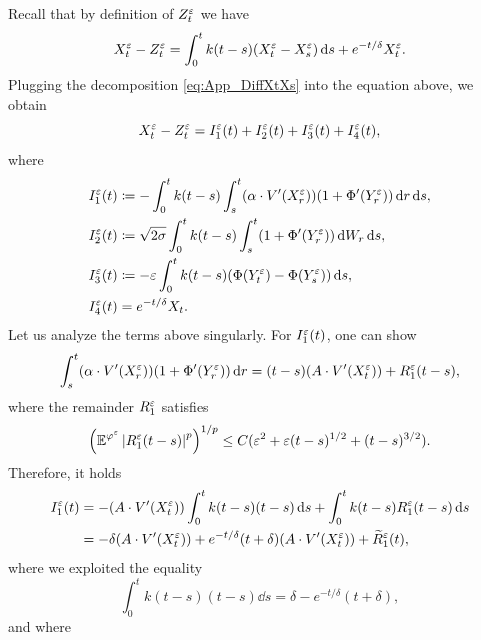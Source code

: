 \documentclass[10pt]{article}
\begin{document}
\begin{appendices}
Recall that by definition of $Z_t^\varepsilon$ we have
	\begin{equation}
	X_t^\varepsilon - Z_t^\varepsilon = \int_0^t k(t-s) (X_t^\varepsilon - X_s^\varepsilon) \,\mathrm{d} s + e^{-t/\delta}X_t^\varepsilon.
	\end{equation}
	Plugging the decomposition \eqref{eq:App_DiffXtXs} into the equation above, we obtain
	\begin{equation}
	X_t^\varepsilon - Z_t^\varepsilon = I_1^\varepsilon(t) + I_2^\varepsilon(t) + I_3^\varepsilon(t) + I_4^\varepsilon(t),
	\end{equation}
	where
	\begin{equation}
	\begin{aligned}
	I_1^\varepsilon(t) &\coloneqq -\int_0^t k(t-s)\int_s^t (\alpha \cdot V'(X_r^\varepsilon))(1 + \Phi'(Y^\varepsilon_r)) \,\mathrm{d} r \,\mathrm{d} s,\\
	I_2^\varepsilon(t) &\coloneqq \sqrt{2\sigma}\int_0^t k(t-s) \int_s^t (1 + \Phi'(Y_r^\varepsilon)) \,\mathrm{d} W_r \,\mathrm{d} s, \\
	I_3^\varepsilon(t) &\coloneqq - \varepsilon \int_0^t k(t-s)(\Phi(Y^\varepsilon_t)-\Phi(Y^\varepsilon_s)) \,\mathrm{d} s,\\
	I_4^\varepsilon(t) &= e^{-t / \delta}X_t.
	\end{aligned}
	\end{equation}
	Let us analyze the terms above singularly. For $I_1^\varepsilon(t)$, one can show \cite[Proposition 5.8]{PaS07}
	\begin{equation}
	\int_s^t (\alpha \cdot V'(X_r^\varepsilon)) (1 + \Phi'(Y^\varepsilon_r)) \,\mathrm{d} r = (t - s)(A \cdot V'(X_t^\varepsilon)) + R_1^\varepsilon(t-s),
	\end{equation}
	where the remainder $R_1^\varepsilon$ satisfies 
	\begin{equation}\label{eq:FirstTermPavStu}
	\left(\operatorname{\mathbb{E}}^{\varphi^\varepsilon}\left\lvert R_1^\varepsilon(t-s)\right\rvert^p\right)^{1/p} \leq C(\varepsilon^2 + \varepsilon(t-s)^{1/2}+(t-s)^{3/2}).
	\end{equation}
	Therefore, it holds 
	\begin{equation}\label{eq:Diff_I1}
	\begin{aligned}
	I_1^\varepsilon(t) &= -(A \cdot V'(X_t^\varepsilon)) \int_0^t k(t-s) (t-s)\,\mathrm{d} s + \int_0^t k(t-s)R_1^\varepsilon(t-s) \,\mathrm{d} s\\
	&= -\delta (A \cdot  V'(X_t^\varepsilon)) + e^{-t/\delta}(t + \delta)(A \cdot V'(X_t^\varepsilon)) + \widetilde R_1^\varepsilon(t),
	\end{aligned}
	\end{equation}
	where we exploited the equality
	\begin{equation}
	\int_0^t k(t-s) (t-s) \dd s = \delta - e^{-t/\delta}(t + \delta),
	\end{equation}
	and where
	\begin{equation}

\end{equation}
\end{appendices}
\end{document}
